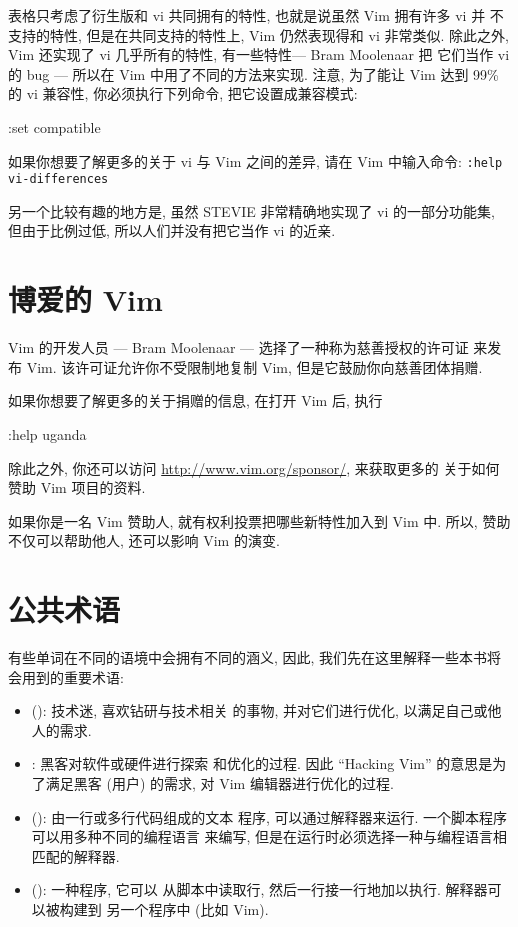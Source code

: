 表格只考虑了衍生版和 vi 共同拥有的特性, 也就是说虽然 Vim 拥有许多 vi 并
不支持的特性, 但是在共同支持的特性上, Vim 仍然表现得和 vi 非常类似.
除此之外, Vim 还实现了 vi 几乎所有的特性, 有一些特性--- Bram Moolenaar 把
它们当作 vi 的 bug --- 所以在 Vim 中用了不同的方法来实现. 注意, 为了能让
Vim 达到 99\% 的 vi 兼容性, 你必须执行下列命令, 把它设置成兼容模式:
\begin{vimcmd}
:set compatible
\end{vimcmd}
\begin{warning}
    如果你想要了解更多的关于 vi 与 Vim 之间的差异, 请在 Vim 中输入命令:
    \texttt{:help vi-differences}
\end{warning}
另一个比较有趣的地方是, 虽然 STEVIE 非常精确地实现了 vi 的一部分功能集,
但由于比例过低, 所以人们并没有把它当作 vi 的近亲.

\section{博爱的 Vim}
\label{sec:vim_is_charityware}
Vim 的开发人员 --- Bram Moolenaar --- 选择了一种称为慈善授权的许可证
来发布 Vim. 该许可证允许你不受限制地复制 Vim, 但是它鼓励你向慈善团体捐赠.

如果你想要了解更多的关于捐赠的信息, 在打开 Vim 后, 执行
\begin{vimcmd}
:help uganda
\end{vimcmd}
除此之外, 你还可以访问 \url{http://www.vim.org/sponsor/}, 来获取更多的
关于如何赞助 Vim 项目的资料.

如果你是一名 Vim 赞助人, 就有权利投票把哪些新特性加入到 Vim 中. 所以, 
赞助不仅可以帮助他人, 还可以影响 Vim 的演变.

\section{公共术语}
\label{sec:common_terminology}

有些单词在不同的语境中会拥有不同的涵义, 因此, 我们先在这里解释一些本书将
会用到的重要术语:
\begin{itemize}
    \item {} (): 技术迷, 喜欢钻研与技术相关
        的事物, 并对它们进行优化, 以满足自己或他人的需求.
    \item {}: 黑客对软件或硬件进行探索
        和优化的过程. 因此 ``Hacking Vim'' 的意思是为了满足黑客 (用户)
        的需求, 对 Vim 编辑器进行优化的过程.
    \item {} (): 由一行或多行代码组成的文本
        程序, 可以通过解释器来运行. 一个脚本程序可以用多种不同的编程语言
        来编写, 但是在运行时必须选择一种与编程语言相匹配的解释器.
    \item {} (): 一种程序, 它可以
        从脚本中读取行, 然后一行接一行地加以执行. 解释器可以被构建到
        另一个程序中 (比如 Vim).
\end{itemize}
